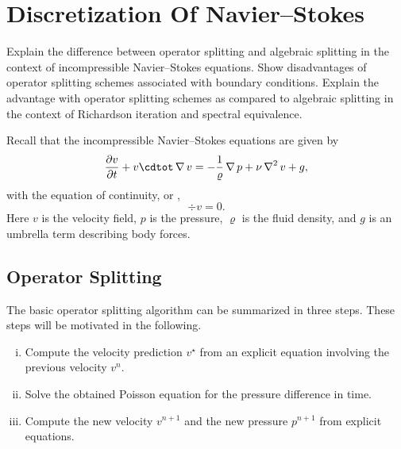 \chapter[Navier--Stokes]{Discretization Of Navier--Stokes}

\begin{problem_text}
    Explain the difference between operator splitting and algebraic splitting
    in the context of incompressible Navier--Stokes equations. Show
    disadvantages of operator splitting schemes associated with boundary
    conditions. Explain the advantage with operator splitting schemes as
    compared to algebraic splitting in the context of Richardson iteration and
    spectral equivalence.
\end{problem_text}

Recall that the incompressible Navier--Stokes equations are given by
\begin{equation}
    \label{eq:NS}
    \frac{\partial v}{\partial t} + v \cdtot \grad v = -\frac{1}{\varrho} \grad p + \nu \grad^2 v + g,
\end{equation}
with the equation of continuity, or ,
\begin{equation}
    \label{eq:NSc}
    \div v = 0.
\end{equation}
Here \( v \) is the velocity field, \( p \) is the pressure, \( \varrho \) is
the fluid density, and \( g \) is an umbrella term describing body forces.

\section{Operator Splitting}
\label{sub:operator_splitting}

The basic operator splitting algorithm can be summarized in three steps.  These
steps will be motivated in the following.
\begin{enumerate}[(i)]
    \item Compute the velocity prediction \( v^\star \) from an explicit equation involving the previous velocity \( v^n \).
    \item Solve the obtained Poisson equation for the pressure difference in time.
    \item Compute the new velocity \( v^{n+1} \) and the new pressure \(
        p^{n+1} \) from explicit equations.
\end{enumerate}

